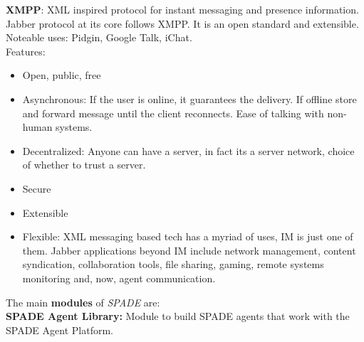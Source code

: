 \documentclass[a4paper, 11pt]{article}
\begin{document}
\textbf{XMPP}: XML inspired protocol for instant messaging and presence information. Jabber protocol at its core follows XMPP. It is an open standard and extensible. Noteable uses: Pidgin, Google Talk, iChat. \\
Features: \\
\begin{itemize}
	\item Open, public, free
	\item Asynchronous: If the user is online, it guarantees the delivery. If offline store and forward message until the client reconnects. Ease of talking with non-human systems.
	\item Decentralized: Anyone can have a server, in fact its a server network, choice of whether to trust a server.
	\item Secure
	\item Extensible
	\item Flexible: XML messaging based tech has a myriad of uses, IM is just one of them. Jabber applications beyond IM include network management, content syndication, collaboration tools, file sharing, gaming, remote systems monitoring and, now, agent communication.
\end{itemize}

\noindent The main \textbf{modules} of \textit{SPADE} are: \\

\textbf{SPADE Agent Library:} Module to build SPADE agents that work with the SPADE Agent Platform. \\
\end{document}
